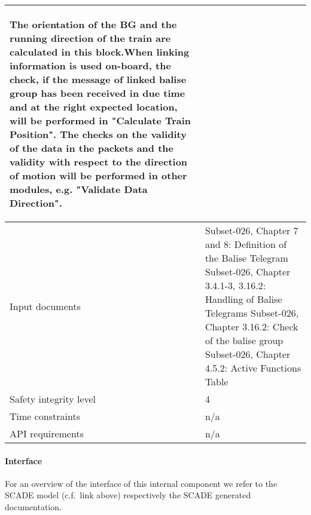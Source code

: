 \begin{longtable}{p{}p{}}
\begin{itemize}
\end{itemize}
The orientation of the BG and the running direction of the train are
calculated in this block.When linking information is used on-board,
the check, if the message of linked balise group has been received
in due time and at the right expected location, will be performed in
"Calculate Train Position". The checks on the validity of the data in
the packets and the validity with respect to the direction of motion
will be performed in other modules, e.g. "Validate Data Direction".\\
\midrule
Input documents	& 
Subset-026, Chapter 7 and 8: Definition of the Balise Telegram\newline
Subset-026, Chapter 3.4.1-3, 3.16.2: Handling of Balise Telegrams\newline
Subset-026, Chapter 3.16.2: Check of the balise group\newline
Subset-026, Chapter 4.5.2: Active Functions Table\\
\midrule
Safety integrity level		& 4 \\
\midrule
Time constraints		& n/a \\
\midrule
API requirements 		& n/a \\
\bottomrule
\end{longtable}


\paragraph{Interface}

For an overview of the interface of this internal component we refer to the SCADE model (c.f.~link above) respectively the SCADE generated documentation.
